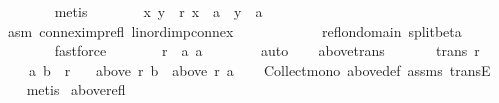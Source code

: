 \begin{isabellebody}
\ \ \ \ \ \ \isamarkupfalse%
\ metis\isanewline
\ \ \ \ \isamarkupfalse%
\ \isamarkupfalse%
\ {\isachardoublequoteopen}{\isasymforall}{\isacharparenleft}{\kern0pt}x{\isacharcomma}{\kern0pt}\ y{\isacharparenright}{\kern0pt}\ {\isasymin}\ r{\isachardot}{\kern0pt}\ x\ {\isacharequal}{\kern0pt}\ a\ {\isasymand}\ y\ {\isacharequal}{\kern0pt}\ a{\isachardoublequoteclose}\isanewline
\ \ \ \ \ \ \isamarkupfalse%
\ asm\ connex{\isacharunderscore}{\kern0pt}imp{\isacharunderscore}{\kern0pt}refl\ lin{\isacharunderscore}{\kern0pt}ord{\isacharunderscore}{\kern0pt}imp{\isacharunderscore}{\kern0pt}connex\isanewline
\ \ \ \ \ \ \ \ \ \ \ \ refl{\isacharunderscore}{\kern0pt}on{\isacharunderscore}{\kern0pt}domain\ split{\isacharunderscore}{\kern0pt}beta\isanewline
\ \ \ \ \ \ \isamarkupfalse%
\ fastforce\isanewline
\ \ \ \ \isamarkupfalse%
\ \isamarkupfalse%
\ {\isachardoublequoteopen}r\ {\isacharequal}{\kern0pt}\ {\isacharbraceleft}{\kern0pt}{\isacharparenleft}{\kern0pt}a{\isacharcomma}{\kern0pt}\ a{\isacharparenright}{\kern0pt}{\isacharbraceright}{\kern0pt}{\isachardoublequoteclose}\isanewline
\ \ \ \ \ \ \isamarkupfalse%
\ auto\isanewline
\ \ \isamarkupfalse%
\isanewline
{}\isamarkupfalse%
%
\endisatagproof
{\isafoldproof}%
%
\isadelimproof
%
\endisadelimproof
%
\isadelimdocument
%
\endisadelimdocument
%
\isatagdocument
%
\isamarkuptrue%
%
\endisatagdocument
{\isafolddocument}%
%
\isadelimdocument
%
\endisadelimdocument
{}\isamarkupfalse%
\ above{\isacharunderscore}{\kern0pt}trans{\isacharcolon}{\kern0pt}\isanewline
\ \ \isanewline
\ \ \ \ {\isachardoublequoteopen}trans\ r{\isachardoublequoteclose}\ \isanewline
\ \ \ \ {\isachardoublequoteopen}{\isacharparenleft}{\kern0pt}a{\isacharcomma}{\kern0pt}\ b{\isacharparenright}{\kern0pt}\ {\isasymin}\ r{\isachardoublequoteclose}\isanewline
\ \ \ {\isachardoublequoteopen}above\ r\ b\ {\isasymsubseteq}\ above\ r\ a{\isachardoublequoteclose}\isanewline
%
\isadelimproof
\ \ %
\endisadelimproof
%
\isatagproof
{}\isamarkupfalse%
\ Collect{\isacharunderscore}{\kern0pt}mono\ above{\isacharunderscore}{\kern0pt}def\ assms\ transE\isanewline
\ \ \isamarkupfalse%
\ metis%
\endisatagproof
{\isafoldproof}%
%
\isadelimproof
\isanewline
%
\endisadelimproof
\isanewline
{}\isamarkupfalse%
\ above{\isacharunderscore}{\kern0pt}refl{\isacharcolon}{\kern0pt}\isanewline

\end{isabellebody}
